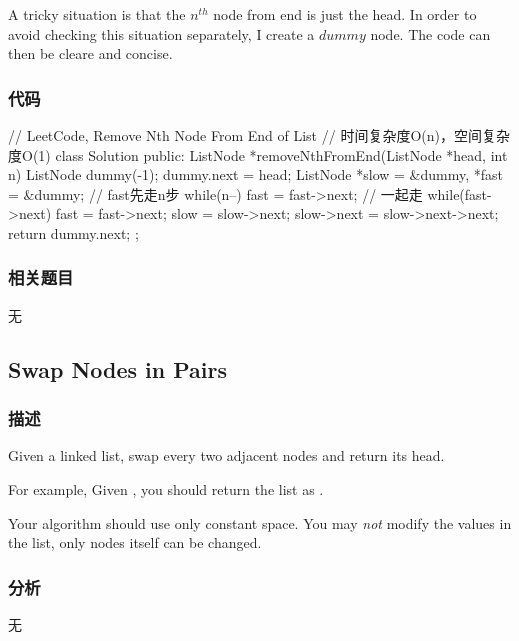 A tricky situation is that the $n^{th}$ node from end is just the head. In order to avoid checking this situation separately, I create a $dummy$ node. The code can then be cleare and concise. 

\subsubsection{代码}
\begin{Code}
// LeetCode, Remove Nth Node From End of List
// 时间复杂度O(n)，空间复杂度O(1)
class Solution {
public:
    ListNode *removeNthFromEnd(ListNode *head, int n) {
        ListNode dummy(-1); dummy.next = head;
        ListNode *slow = &dummy, *fast = &dummy;
        // fast先走n步
        while(n--) fast = fast->next;
        // 一起走
        while(fast->next) {
            fast = fast->next; slow = slow->next;
        }
        slow->next = slow->next->next;
        return dummy.next;
    }
};
\end{Code}


\subsubsection{相关题目}

\begindot
\item 无
\myenddot


\subsection{Swap Nodes in Pairs}
\label{sec:swap-nodes-in-pairs}


\subsubsection{描述}
Given a linked list, swap every two adjacent nodes and return its head.

For example,
Given , you should return the list as .

Your algorithm should use only constant space. You may \emph{not} modify the values in the list, only nodes itself can be changed.


\subsubsection{分析}
无


